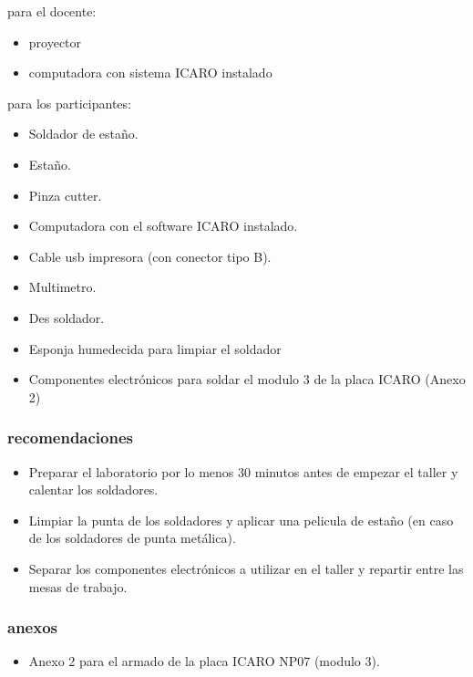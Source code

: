 para el docente:
\begin{itemize}
  \item proyector
  \item computadora con sistema ICARO instalado
\end{itemize}
para los participantes:
\begin{itemize}
  \item Soldador de estaño.
  \item Estaño.
  \item Pinza cutter.
  \item Computadora con el software ICARO instalado.
  \item Cable usb impresora (con conector tipo B).
  \item Multimetro.
  \item Des soldador.
  \item Esponja humedecida para limpiar el soldador
  \item Componentes electrónicos para soldar el modulo 3 de la placa ICARO (Anexo 2) 
\end{itemize}

\subsubsection{recomendaciones}

\begin{itemize}
  \item Preparar el laboratorio por lo menos 30 minutos antes de empezar el taller y calentar los soldadores.

  \item Limpiar la punta de los soldadores y aplicar una pelicula de estaño (en caso de los soldadores de punta metálica).

  \item Separar los componentes electrónicos a utilizar en el taller y repartir entre las mesas de trabajo.

\end{itemize}
\subsubsection{anexos}
\begin{itemize}
  \item Anexo 2 para el armado de la placa ICARO NP07 (modulo 3).
\end{itemize}

\newpage
